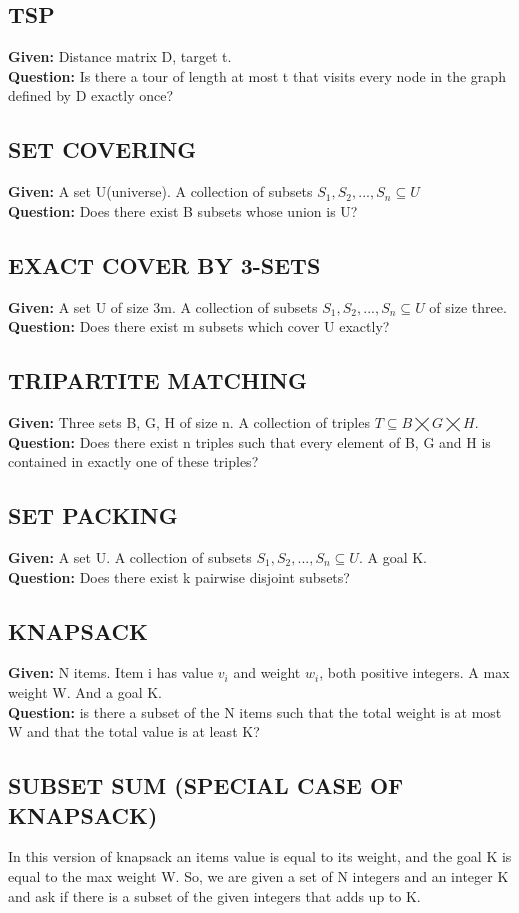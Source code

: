 \subsection{TSP}
\textbf{Given:} Distance matrix D, target t. \\
\textbf{Question:} Is there a tour of length at most t that visits every node in the graph defined by D exactly once?\\
\subsection{SET COVERING}
\textbf{Given:} 
A set U(universe). A collection of subsets $S_1,S_2,...,S_n \subseteq U$\\
\textbf{Question:} Does there exist B subsets whose union is U?
\subsection{EXACT COVER BY 3-SETS}
\textbf{Given:} 
A set U of size 3m. A collection of subsets $S_1,S_2,...,S_n \subseteq U$ of size three.\\
\textbf{Question:} Does there exist m subsets which cover U exactly? 
\subsection{TRIPARTITE MATCHING}
\textbf{Given:} 
Three sets B, G, H of size n. A collection of triples $T \subseteq B \bigtimes G \bigtimes H.$\\
\textbf{Question:} Does there exist n triples such that every element of B, G and H is contained in exactly one of these triples?
\subsection{SET PACKING}
\textbf{Given:} 
A set U. A collection of subsets $S_1,S_2,...,S_n \subseteq U$. A goal K.\\
\textbf{Question:} Does there exist k pairwise disjoint subsets?
\subsection{KNAPSACK}
\textbf{Given:} 
N items. Item i has value $v_i$ and weight $w_i$, both positive integers. A max weight W. And a goal K. \\
\textbf{Question:} is there a subset of the N items such that the total weight is at most W and that the total value is at least K?
\subsection{SUBSET SUM (SPECIAL CASE OF KNAPSACK)}
In this version of knapsack an items value is equal to its weight, and the goal K is equal to the max weight W. So, we are given a set of N integers and an integer K and ask if there is a subset of the given integers that adds up to K.
